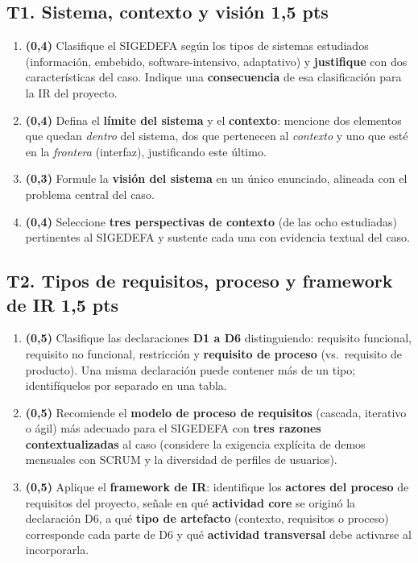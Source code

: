 \documentclass[11pt]{article}
\newcommand{\pts}[1]{\hfill{\normalsize\textbf{\textcolor{utegreendk}{#1 pts}}}}
\begin{document}
\subsection*{T1. Sistema, contexto y visión \pts{1{,}5}}

\begin{enumerate}[label=\textbf{T1.\arabic*},leftmargin=26pt,itemsep=3pt]
  \item \textbf{(0{,}4)} Clasifique el SIGEDEFA según los tipos de sistemas estudiados (información, embebido, software-intensivo, adaptativo) y \textbf{justifique} con dos características del caso. Indique una \textbf{consecuencia} de esa clasificación para la IR del proyecto.
  \item \textbf{(0{,}4)} Defina el \textbf{límite del sistema} y el \textbf{contexto}: mencione dos elementos que quedan \emph{dentro} del sistema, dos que pertenecen al \emph{contexto} y uno que esté en la \emph{frontera} (interfaz), justificando este último.
  \item \textbf{(0{,}3)} Formule la \textbf{visión del sistema} en un único enunciado, alineada con el problema central del caso.
  \item \textbf{(0{,}4)} Seleccione \textbf{tres perspectivas de contexto} (de las ocho estudiadas) pertinentes al SIGEDEFA y sustente cada una con evidencia textual del caso.
\end{enumerate}

\subsection*{T2. Tipos de requisitos, proceso y framework de IR \pts{1{,}5}}

\begin{enumerate}[label=\textbf{T2.\arabic*},leftmargin=26pt,itemsep=3pt]
  \item \textbf{(0{,}5)} Clasifique las declaraciones \textbf{D1 a D6} distinguiendo: requisito funcional, requisito no funcional, restricción y \textbf{requisito de proceso} (vs.\ requisito de producto). Una misma declaración puede contener más de un tipo; identifíquelos por separado en una tabla.
  \item \textbf{(0{,}5)} Recomiende el \textbf{modelo de proceso de requisitos} (cascada, iterativo o ágil) más adecuado para el SIGEDEFA con \textbf{tres razones contextualizadas} al caso (considere la exigencia explícita de demos mensuales con SCRUM y la diversidad de perfiles de usuarios).
  \item \textbf{(0{,}5)} Aplique el \textbf{framework de IR}: identifique los \textbf{actores del proceso} de requisitos del proyecto, señale en qué \textbf{actividad core} se originó la declaración D6, a qué \textbf{tipo de artefacto} (contexto, requisitos o proceso) corresponde cada parte de D6 y qué \textbf{actividad transversal} debe activarse al incorporarla.
\end{enumerate}
\end{document}
